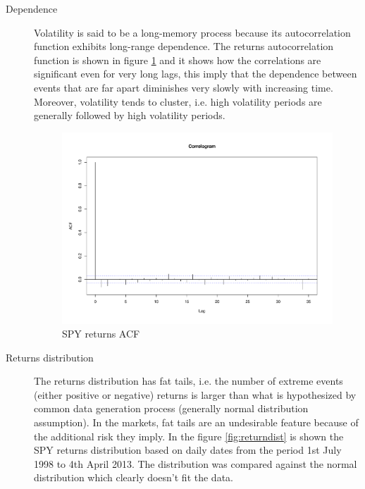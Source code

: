 \begin{description}
 \item[Dependence] Volatility is said to be a long-memory process because its autocorrelation function exhibits long-range dependence. The returns autocorrelation function is shown in figure \ref{fig:returnacf} and it shows how the correlations are significant even for very long lags, this imply that the dependence between events that are far apart diminishes very slowly with increasing time.
 Moreover, volatility tends to cluster, i.e. high volatility periods are generally followed by high volatility periods.
 
 \begin{figure}[h]
 \centering
 \includegraphics[scale=0.5]{plots/spy_returns_acf.pdf}
 \caption{SPY returns ACF}
 \label{fig:returnacf}
\end{figure}

 \item[Returns distribution] The returns distribution has fat tails, i.e. the number of extreme events (either positive or negative) returns is larger than what is hypothesized by common data generation process (generally normal distribution assumption). In the markets, fat tails are an undesirable feature because of the additional risk they imply.
 In the figure \ref{fig:returndist} is shown the SPY returns distribution based on daily dates from the period 1st July 1998 to 4th April 2013. The distribution was compared against the normal distribution which clearly doesn't fit the data.  
 

\end{description}
